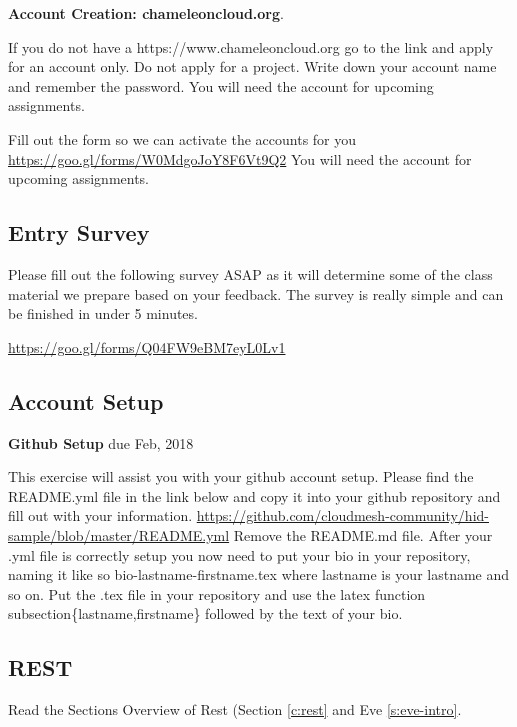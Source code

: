 \begin{exercise}
  {\bf Account Creation: chameleoncloud.org}. 
  
  If you do not have a
  https://www.chameleoncloud.org go to the link and apply for an
  account only. Do not apply for a project. Write down your account
  name and remember the password. You will need the account for
  upcoming assignments.
\end{exercise}

\begin{exercise}
Fill out the form so we can activate the accounts for you
\url{https://goo.gl/forms/W0MdgoJoY8F6Vt9Q2}
You will need the account for
  upcoming assignments.
\end{exercise}

\subsection{Entry Survey}
\begin{exercise}
Please fill out the following survey ASAP as it will determine some of the class material we prepare based on your feedback. The survey is really simple and can be finished in under 5 minutes.

\url{https://goo.gl/forms/Q04FW9eBM7eyL0Lv1}
\end{exercise}

\subsection{Account Setup}

\begin{exercise} {\bf Github Setup} due Feb, 2018

This exercise will assist you with your github account setup. Please find the README.yml file in the link below and copy it into your github repository and fill out with your information. \url{https://github.com/cloudmesh-community/hid-sample/blob/master/README.yml} Remove the README.md file. After your .yml file is correctly setup you now need to put your bio in your repository, naming it like so bio-lastname-firstname.tex where lastname is your lastname and so on. Put the .tex file in your repository and use the latex function subsection\{lastname,firstname\} followed by the text of your bio.

\end{exercise}

\subsection{REST}
\begin{exercise}
Read the Sections Overview of Rest (Section \ref{c:rest} and Eve \ref{s:eve-intro}.
\end{exercise}

